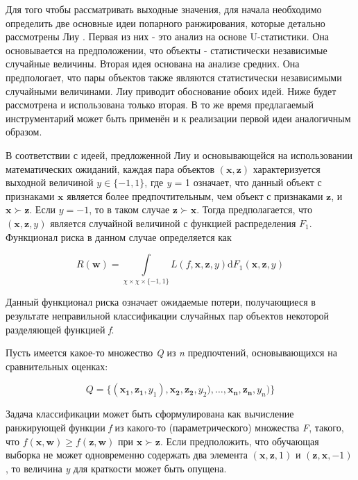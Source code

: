 \documentclass[12pt,a4paper,oneside]{article}
\begin{document}
\par
Для того чтобы рассматривать выходные значения, для начала необходимо определить две основные идеи попарного ранжирования, которые детально рассмотрены Лиу .
Первая из них - это анализ на основе U-статистики.
Она основывается на предположении, что объекты - статистически независимые случайные величины.
Вторая идея основана на анализе средних. 
Она предпологает, что пары объектов также являются статистически независимыми случайными величинами. 
Лиу приводит обоснование обоих идей. 
Ниже будет рассмотрена и использована только вторая. 
В то же время предлагаемый инструментарий может быть применён и к реализации первой идеи аналогичным образом. 

\par
В соответствии с идеей, предложенной Лиу  и основывающейся на использовании математических ожиданий, каждая пара объектов \((\mathbf{x}, \mathbf{z})\) характеризуется выходной величиной \(y \in \{-1,1\}\), где \emph{y} = 1 означает, что данный объект с признаками \(\mathbf{x}\) является более предпочтительным, чем объект с признаками \(\mathbf{z}\), и \(\mathbf{x} \succ \mathbf{z}\). Если \(y = -1\), то в таком случае \(\mathbf{z} \succ \mathbf{x}\). Тогда предполагается, что \((\mathbf{x}, \mathbf{z}, y)\) является случайной величиной с функцией распределения \(F_1\). Функционал риска в данном случае определяется как

\[
R(\mathbf{w}) = \int \limits_{\chi \times \chi \times \{-1, 1\}} L(f, \mathbf{x}, \mathbf{z}, y) \mathrm{d} F_1(\mathbf{x}, \mathbf{z}, y)
\]

\par

Данный функционал риска означает ожидаемые потери, получающиеся в результате неправильной классификации случайных пар объектов некоторой разделяющей функцией \emph{f}. 

\par
Пусть имеется какое-то множество \emph{Q} из \emph{n} предпочтений, основывающихся на сравнительных оценках:

\[
Q = \{(\mathbf{x_1}, \mathbf{z_1}, y_1), \mathbf{x_2}, \mathbf{z_2}, y_2), \dots, \mathbf{x_n}, \mathbf{z_n}, y_n)\}
\]

\par
Задача классификации может быть сформулирована как вычисление ранжирующей функции \emph{f} из какого-то (параметрического) множества \emph{F}, такого, что \(f(\mathbf{x}, \mathbf{w}) \geq f(\mathbf{z}, \mathbf{w})\) при \(\mathbf{x} \succ \mathbf{z}\). 
Если предположить, что обучающая выборка не может одновременно содержать два элемента \((\mathbf{x}, \mathbf{z}, 1)\) и \((\mathbf{z}, \mathbf{x}, -1)\), то величина \emph{y} для краткости может быть опущена. 
\end{document}
